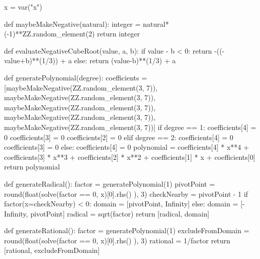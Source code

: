 \documentclass{ximera}
\begin{document}
\begin{sagesilent}
x = var("x")
 
def maybeMakeNegative(natural):
    integer = natural*(-1)**ZZ.random_element(2)
    return integer
 
def evaluateNegativeCubeRoot(value, a, b):
    if value - b < 0:
        return -((-value+b)**(1/3)) + a
    else:
        return (value-b)**(1/3) + a
 
def generatePolynomial(degree):
    coefficients = [maybeMakeNegative(ZZ.random_element(3, 7)), maybeMakeNegative(ZZ.random_element(3, 7)), maybeMakeNegative(ZZ.random_element(3, 7)), maybeMakeNegative(ZZ.random_element(3, 7)), maybeMakeNegative(ZZ.random_element(3, 7))]
    if degree == 1:
        coefficients[4] = 0
        coefficients[3] = 0
        coefficients[2] = 0
    elif degree == 2:
        coefficients[4] = 0
        coefficients[3] = 0
    else:
        coefficients[4] = 0
    polynomial = coefficients[4] * x**4 + coefficients[3] * x**3 + coefficients[2] * x**2 + coefficients[1] * x + coefficients[0]
    return polynomial
 
def generateRadical():
    factor = generatePolynomial(1)
    pivotPoint = round(float(solve(factor == 0, x)[0].rhs() ), 3)
    checkNearby = pivotPoint - 1
    if factor(x=checkNearby) < 0:
        domain = [pivotPoint, Infinity]
    else:
        domain = [-Infinity, pivotPoint]
    radical = sqrt(factor)
    return [radical, domain]
 
def generateRational():
    factor = generatePolynomial(1)
    excludeFromDomain = round(float(solve(factor == 0, x)[0].rhs() ), 3)
    rational = 1/factor
    return [rational, excludeFromDomain]
 

\end{sagesilent}
\end{document}
